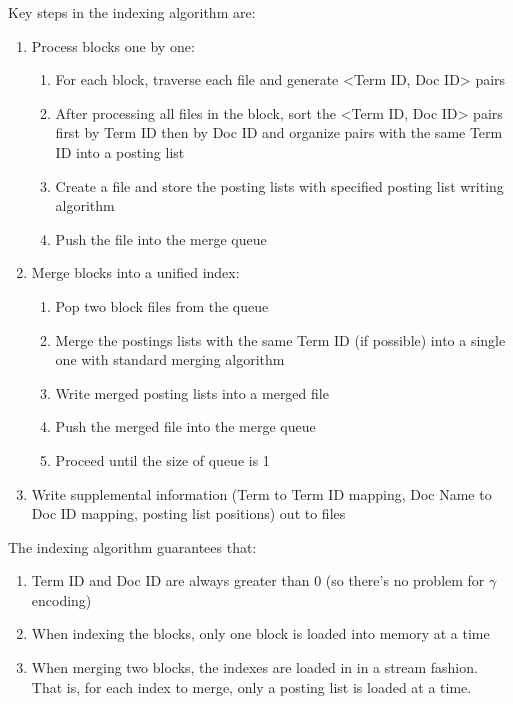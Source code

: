 \documentclass{article}
\begin{document}
Key steps in the indexing algorithm are:
\begin{enumerate}
  \item Process blocks one by one:
  \begin{enumerate}
    \item For each block, traverse each file and generate \textless Term ID, Doc ID\textgreater{}
    pairs
    
    \item After processing all files in the block, sort the \textless Term ID, Doc ID\textgreater{}
    pairs first by Term ID then by Doc ID and organize pairs with the same
    Term ID into a posting list
    
    \item Create a file and store the posting lists with specified posting
    list writing algorithm
    
    \item Push the file into the merge queue
  \end{enumerate}
  \item Merge blocks into a unified index:
  \begin{enumerate}
    \item Pop two block files from the queue
    
    \item Merge the postings lists with the same Term ID (if possible) into a
    single one with standard merging algorithm
    
    \item Write merged posting lists into a merged file
    
    \item Push the merged file into the merge queue
    
    \item Proceed until the size of queue is 1
  \end{enumerate}
  \item Write supplemental information (Term to Term ID mapping, Doc Name to
  Doc ID mapping, posting list positions) out to files
\end{enumerate}
The indexing algorithm guarantees that:
\begin{enumerate}
  \item Term ID and Doc ID are always greater than 0 (so there's no problem for $\gamma$ encoding)
  
  \item When indexing the blocks, only one block is loaded into memory at a
  time
  
  \item When merging two blocks, the indexes are loaded in in a stream
  fashion. That is, for each index to merge, only a posting list is loaded at
  a time.
\end{enumerate}
\end{document}
